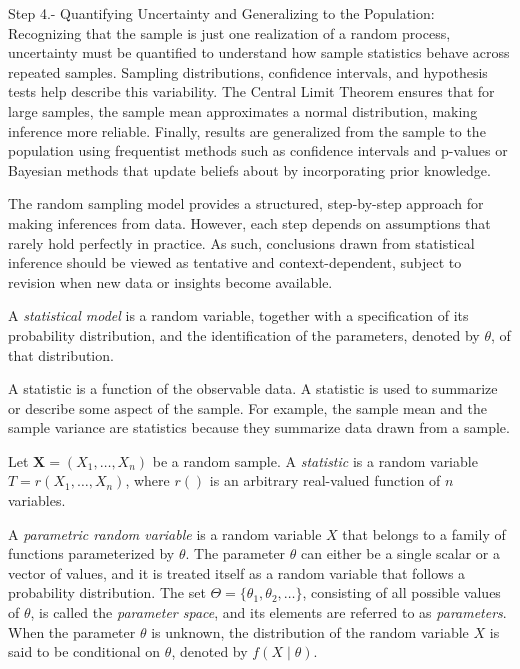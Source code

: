 Step 4.- Quantifying Uncertainty and Generalizing to the Population: Recognizing that the sample is just one realization of a random process, uncertainty must be quantified to understand how sample statistics behave across repeated samples. Sampling distributions, confidence intervals, and hypothesis tests help describe this variability. The Central Limit Theorem ensures that for large samples, the sample mean  approximates a normal distribution, making inference more reliable. Finally, results are generalized from the sample to the population using frequentist methods such as confidence intervals and p-values or Bayesian methods that update beliefs about  by incorporating prior knowledge.

The random sampling model provides a structured, step-by-step approach for making inferences from data. However, each step depends on assumptions that rarely hold perfectly in practice. As such, conclusions drawn from statistical inference should be viewed as tentative and context-dependent, subject to revision when new data or insights become available.

\begin{definition}
A \emph{statistical model} is a random variable, together with a specification of its probability distribution, and the identification of the parameters, denoted by $\theta$, of that distribution.
\end{definition}

A statistic is a function of the observable data. A statistic is used to summarize or describe some aspect of the sample. For example, the sample mean and the sample variance are statistics because they summarize data drawn from a sample.

\begin{definition}
Let $\mathbf{X}=\left(X_{1},\ldots,X_{n}\right)$ be a random sample. A \emph{statistic} is a random variable $T = r \left( X_1, \ldots, X_n \right)$, where $r()$ is an arbitrary real-valued function of $n$ variables.
\end{definition}

A \emph{parametric random variable} is a random variable $X$ that belongs to a family of functions parameterized by $\theta$. The parameter $\theta$ can either be a single scalar or a vector of values, and it is treated itself as a random variable that follows a probability distribution. The set $\Theta = \{ \theta_1, \theta_2, \ldots \}$, consisting of all possible values of $\theta$, is called the \emph{parameter space}, and its elements are referred to as \emph{parameters}. When the parameter $\theta$ is unknown, the distribution of the random variable $X$ is said to be conditional on $\theta$, denoted by $f\left(X \mid \theta \right)$.

